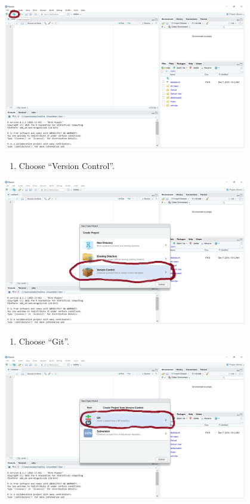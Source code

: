 \documentclass[
]{article}
\providecommand{\tightlist}{%
  \setlength{\itemsep}{0pt}\setlength{\parskip}{0pt}}
\begin{document}
\includegraphics[width=0.8\textwidth,height=\textheight]{./figures/project1.png}

\begin{enumerate}
\def\labelenumi{\arabic{enumi}.}
\setcounter{enumi}{1}
\tightlist
\item
  Choose ``Version Control''.
\end{enumerate}

\includegraphics[width=0.8\textwidth,height=\textheight]{./figures/project2.png}

\begin{enumerate}
\def\labelenumi{\arabic{enumi}.}
\setcounter{enumi}{2}
\tightlist
\item
  Choose ``Git''.
\end{enumerate}

\includegraphics[width=0.8\textwidth,height=\textheight]{./figures/project3.png}
\end{document}
